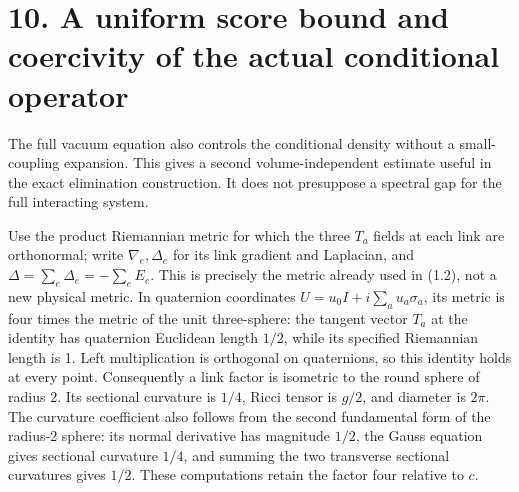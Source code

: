\documentclass[
]{article}
\begin{document}
\section{10. A uniform score bound and coercivity of the actual
conditional
operator}\label{a-uniform-score-bound-and-coercivity-of-the-actual-conditional-operator}

The full vacuum equation also controls the conditional density without a
small-coupling expansion. This gives a second volume-independent
estimate useful in the exact elimination construction. It does not
presuppose a spectral gap for the full interacting system.

Use the product Riemannian metric for which the three \(T_a\) fields at
each link are orthonormal; write \(\nabla_e,\Delta_e\) for its link
gradient and Laplacian, and \(\Delta=\sum_e\Delta_e=-\sum_eE_e\). This
is precisely the metric already used in (1.2), not a new physical
metric. In quaternion coordinates \(U=u_0I+i\sum_a u_a\sigma_a\), its
metric is four times the metric of the unit three-sphere: the tangent
vector \(T_a\) at the identity has quaternion Euclidean length \(1/2\),
while its specified Riemannian length is 1. Left multiplication is
orthogonal on quaternions, so this identity holds at every point.
Consequently a link factor is isometric to the round sphere of radius 2.
Its sectional curvature is \(1/4\), Ricci tensor is \(g/2\), and
diameter is \(2\pi\). The curvature coefficient also follows from the
second fundamental form of the radius-2 sphere: its normal derivative
has magnitude \(1/2\), the Gauss equation gives sectional curvature
\(1/4\), and summing the two transverse sectional curvatures gives
\(1/2\). These computations retain the factor four relative to \(c\).
\end{document}
